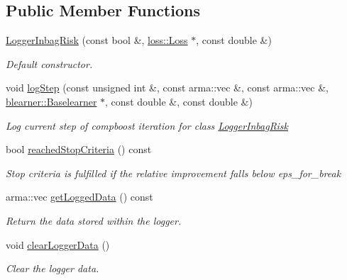 \subsection*{Public Member Functions}
\begin{DoxyCompactItemize}
\item 
\mbox{\hyperlink{classlogger_1_1_logger_inbag_risk_ad6aa28d3140dc547f051a3ccd0cde43d}{Logger\+Inbag\+Risk}} (const bool \&, \mbox{\hyperlink{classloss_1_1_loss}{loss\+::\+Loss}} $\ast$, const double \&)
\begin{DoxyCompactList}\small\item\em Default constructor. \end{DoxyCompactList}\item 
void \mbox{\hyperlink{classlogger_1_1_logger_inbag_risk_aa7cb90600de663c51feaaf8a0715a0f9}{log\+Step}} (const unsigned int \&, const arma\+::vec \&, const arma\+::vec \&, \mbox{\hyperlink{classblearner_1_1_baselearner}{blearner\+::\+Baselearner}} $\ast$, const double \&, const double \&)
\begin{DoxyCompactList}\small\item\em Log current step of compboost iteration for class {\ttfamily \mbox{\hyperlink{classlogger_1_1_logger_inbag_risk}{Logger\+Inbag\+Risk}}} \end{DoxyCompactList}\item 
bool \mbox{\hyperlink{classlogger_1_1_logger_inbag_risk_a48453cfb5a3bbe3b1a73bbcb2d40f49e}{reached\+Stop\+Criteria}} () const
\begin{DoxyCompactList}\small\item\em Stop criteria is fulfilled if the relative improvement falls below {\ttfamily eps\+\_\+for\+\_\+break} \end{DoxyCompactList}\item 
arma\+::vec \mbox{\hyperlink{classlogger_1_1_logger_inbag_risk_abde2b1db608804ca90ce92cd0e5dde12}{get\+Logged\+Data}} () const
\begin{DoxyCompactList}\small\item\em Return the data stored within the logger. \end{DoxyCompactList}\item 
void \mbox{\hyperlink{classlogger_1_1_logger_inbag_risk_ad5428486e370ae88e3bcb3a6c18d0f44}{clear\+Logger\+Data}} ()
\begin{DoxyCompactList}\small\item\em Clear the logger data. \end{DoxyCompactList}\item 

\end{DoxyCompactItemize}
